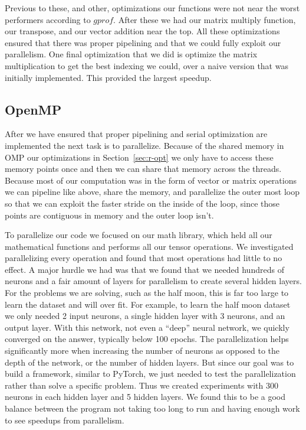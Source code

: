 Previous to these, and other, optimizations our functions were not near the
worst performers according to $gprof$. After these we had our matrix multiply
function, our transpose, and our vector addition near the top. All these
optimizations ensured that there was proper pipelining and that we could fully
exploit our parallelism. One final optimization that we did is optimize the
matrix multiplication to get the best indexing we could, over a naive version
that was initially implemented. This provided the largest speedup.

\subsection{OpenMP}\label{sec:r-omp}
After we have ensured that proper pipelining and serial optimization are
implemented the next task is to parallelize. Because of the shared memory in OMP
our optimizations in Section~\ref{sec:r-opt} we only have to access these memory
points once and then we can share that memory across the threads. Because most
of our computation was in the form of vector or matrix operations we can
pipeline like above, share the memory, and parallelize the outer most loop so
that we can exploit the faster stride on the inside of the loop, since those
points are contiguous in memory and the outer loop isn't. 

To parallelize our code we focused on our math library, which held all our
mathematical functions and performs all our tensor operations. We investigated
parallelizing every operation and found that most operations had little to no
effect. A major hurdle we had was that we found that we needed hundreds of
neurons and a fair amount of layers for parallelism to create several hidden
layers. For the problems we are solving, such as the half moon, this is far too
large to learn the dataset and will over fit. For example, to learn the half
moon dataset we only needed 2 input neurons, a single hidden layer with 3 neurons,
and an output layer. With this network, not even a ``deep'' neural network,
we quickly converged on the answer, typically below 100 epochs. The
parallelization helps significantly more when increasing the number of neurons
as opposed to the depth of the network, or the number of hidden layers. But
since our goal was to build a framework, similar to PyTorch, we just needed to
test the parallelization rather than solve a specific problem. Thus we created
experiments with 300 neurons in each hidden layer and 5 hidden layers. We found
this to be a good balance between the program not taking too long to run and
having enough work to see speedups from parallelism. 

